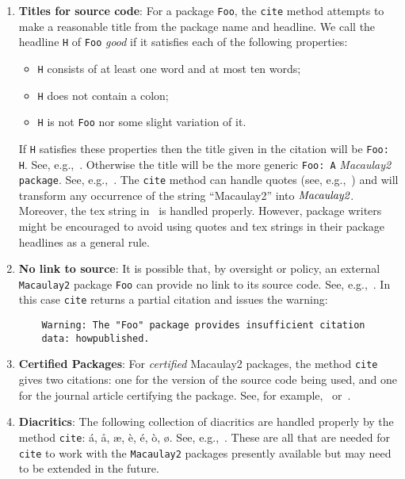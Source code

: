 \documentclass[11pt]{article}
\begin{document}
\begin{enumerate}
	\item \textbf{Titles for source code}: For a package \texttt{Foo}, the \texttt{cite} method attempts to make a reasonable title from the package name and headline. We call the headline \texttt{H} of \texttt{Foo} \emph{good} if it satisfies each of the following properties:
		\begin{itemize}
			\item \texttt{H} consists of at least one word and at most ten words;
			\item \texttt{H} does not contain a colon;
			\item \texttt{H} is not \texttt{Foo} nor some slight variation of it.
		\end{itemize}
	If \texttt{H} satisfies these properties then the title given in the citation will be \texttt{Foo: H}. See, e.g.,~\cite{PackageCitationsSource}. Otherwise the title will be the more generic \texttt{Foo: A} \emph{Macaulay2} \texttt{package}. See, e.g.,~\cite{PieriMapsSource}. The \texttt{cite} method can handle quotes (see, e.g.,~\cite{BrunsSource}) and will transform any occurrence of the string ``Macaulay2'' into $\emph{Macaulay2}$. Moreover, the tex string in~\cite{HodgeIntegralsArticle} is handled properly. However, package writers might be encouraged to avoid using quotes and tex strings in their package headlines as a general rule.

	\item \textbf{No link to source}: It is possible that, by oversight or policy, an external \texttt{Macaulay2} package \texttt{Foo} can provide no link to its source code. See, e.g.,~\cite{MatroidsSource}. In this case \texttt{cite} returns a partial citation and issues the warning:
	\begin{verbatim}
	Warning: The "Foo" package provides insufficient citation
	data: howpublished.
	\end{verbatim}

	\item \textbf{Certified Packages}: For \emph{certified} Macaulay2 packages, the method \texttt{cite} gives two citations: one for the version of the source code being used, and one for the journal article certifying the package. See, for example,~\cite{QuillenSuslinSource,QuillenSuslinArticle} or~\cite{PolyhedraSource,PolyhedraArticle}.

	\item \textbf{Diacritics}: The following collection of diacritics are handled properly by the method \texttt{cite}: \'a, \aa, \ae, \`e, \'e, \`o, \o. See, e.g.,~\cite{PolyhedraSource,LatticePolytopesSource,Schubert2Source}. These are all that are needed for \texttt{cite} to work with the \texttt{Macaulay2} packages presently available but may need to be extended in the future.


\end{enumerate}
\end{document}
